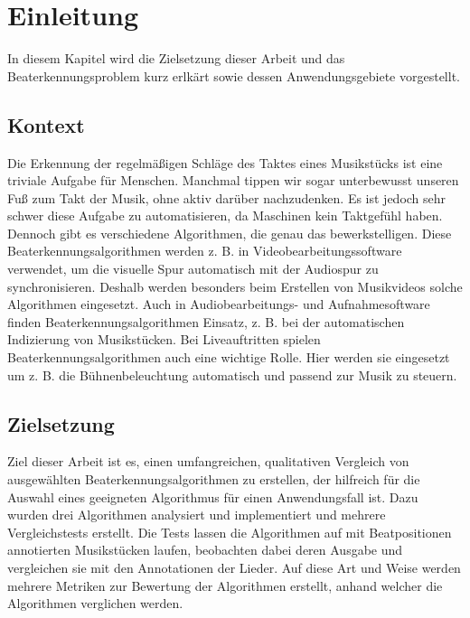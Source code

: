 \chapter{Einleitung}
\label{einleitung}
\acresetall

In diesem Kapitel wird die Zielsetzung dieser Arbeit
	und das Beaterkennungsproblem kurz erlkärt
	sowie dessen Anwendungsgebiete vorgestellt.

\section{Kontext}
{
	Die Erkennung der regelmä{\ss}igen Schläge des Taktes eines Musikstücks ist eine triviale Aufgabe für Menschen.
	Manchmal tippen wir sogar unterbewusst unseren Fu{\ss} zum Takt der Musik,
		ohne aktiv darüber nachzudenken.
	Es ist jedoch sehr schwer diese Aufgabe zu automatisieren,
		da Maschinen kein Taktgefühl haben.
	Dennoch gibt es verschiedene Algorithmen,
		die genau das bewerkstelligen.
	Diese Beaterkennungsalgorithmen werden z. B. in Videobearbeitungssoftware verwendet,
		um die visuelle Spur automatisch mit der Audiospur zu synchronisieren.
	Deshalb werden besonders beim Erstellen von Musikvideos solche Algorithmen eingesetzt.
	Auch in Audiobearbeitungs- und Aufnahmesoftware finden Beaterkennungsalgorithmen Einsatz,
		z. B. bei der automatischen Indizierung von Musikstücken.
	Bei Liveauftritten spielen Beaterkennungsalgorithmen auch eine wichtige Rolle.
	Hier werden sie eingesetzt um z. B. die Bühnenbeleuchtung automatisch und passend zur Musik zu steuern.
}

\section{Zielsetzung}
{
	Ziel dieser Arbeit ist es,
		einen umfangreichen, qualitativen Vergleich von ausgewählten Beaterkennungsalgorithmen zu erstellen,
		der hilfreich für die Auswahl eines geeigneten Algorithmus für einen Anwendungsfall ist.
	Dazu wurden drei Algorithmen analysiert und implementiert
		und mehrere Vergleichstests erstellt.
	Die Tests lassen die Algorithmen auf mit Beatpositionen annotierten Musikstücken laufen,
		beobachten dabei deren Ausgabe
		und vergleichen sie mit den Annotationen der Lieder.
	Auf diese Art und Weise werden mehrere Metriken zur Bewertung der Algorithmen erstellt,
		anhand welcher die Algorithmen verglichen werden.
}

